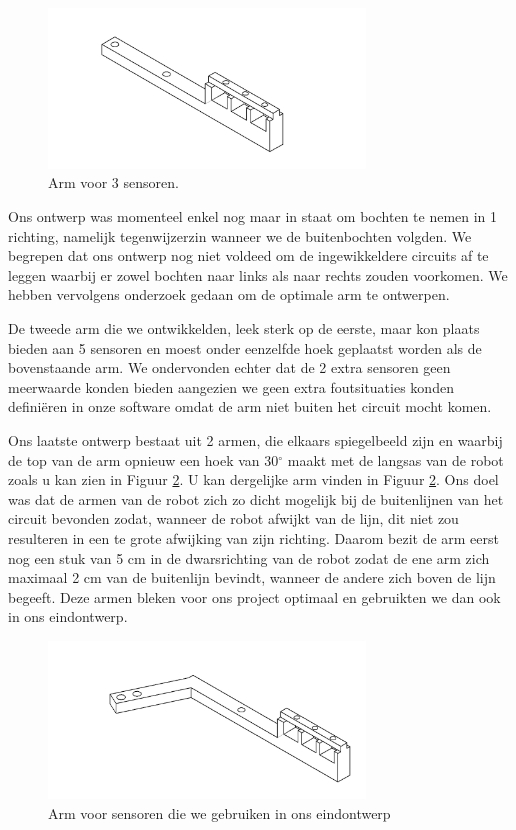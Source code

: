 \begin{figure}[H]
\centering
\includegraphics[width=0.75\textwidth]{3sensoren.png}
\caption{Arm voor 3 sensoren. \label{fig:3sensoren}}
\end{figure}


Ons ontwerp was momenteel enkel nog maar in staat om bochten te nemen in 1 richting, namelijk tegenwijzerzin wanneer we de buitenbochten volgden. We begrepen dat ons ontwerp nog niet voldeed om de ingewikkeldere circuits af te leggen waarbij er zowel bochten naar links als naar rechts zouden voorkomen. We hebben vervolgens onderzoek gedaan om de optimale arm te ontwerpen.

De tweede arm die we ontwikkelden, leek sterk op de eerste, maar kon plaats bieden aan 5 sensoren en moest onder eenzelfde hoek geplaatst worden als de bovenstaande arm. We ondervonden echter dat de 2 extra sensoren geen meerwaarde konden bieden aangezien we geen extra foutsituaties konden defini\"eren in onze software omdat de arm niet buiten het circuit mocht komen. 

Ons laatste ontwerp bestaat uit 2 armen, die elkaars spiegelbeeld zijn en waarbij de top van de arm opnieuw een hoek van 30$^\circ$ maakt met de langsas van de robot zoals u kan zien in Figuur \ref{fig:schuinnaarvoor}. U kan dergelijke arm vinden in Figuur \ref{fig:schuinnaarvoor}. Ons doel was dat de armen van de robot zich zo dicht mogelijk bij de buitenlijnen van het circuit bevonden zodat, wanneer de robot afwijkt van de lijn, dit niet zou resulteren in een te grote afwijking van zijn richting. Daarom bezit de arm eerst nog een stuk van 5 cm in de dwarsrichting van de robot zodat de ene arm zich maximaal 2 cm van de buitenlijn bevindt, wanneer de andere zich boven de lijn begeeft. Deze armen bleken voor ons project optimaal en gebruikten we dan ook in ons eindontwerp.

\begin{figure}[H]
\centering
\includegraphics[width=0.75\textwidth]{schuinnaarvoor.png}
\caption{Arm voor sensoren die we gebruiken in ons eindontwerp \label{fig:schuinnaarvoor}}
\end{figure}

